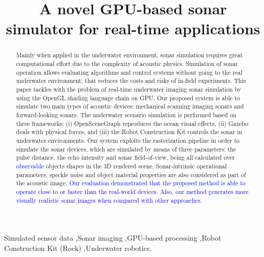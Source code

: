 \documentclass[final,5p,times]{elsarticle}
\begin{document}
\begin{frontmatter}


\title{A novel GPU-based sonar simulator for real-time applications}



\begin{abstract}

Mainly when applied in the underwater environment, sonar simulation requires great computational effort due to the complexity of acoustic physics. Simulation of sonar operation allows evaluating algorithms and control systems without going to the real underwater environment; that reduces the costs and risks of in-field experiments. This paper tackles with the problem of real-time underwater imaging sonar simulation by using the OpenGL shading language chain on GPU. Our proposed system is able to simulate two main types of acoustic devices: mechanical scanning imaging sonars and forward-looking sonars. The underwater scenario simulation is performed based on three frameworks: (i) OpenSceneGraph reproduces the ocean visual effects, (ii) Gazebo deals with physical forces, and (iii) the Robot Construction Kit controls the sonar in underwater environments. Our system exploits the rasterization pipeline in order to simulate the sonar devices, which are simulated by means of three parameters: the pulse distance, the echo intensity and sonar field-of-view, being all calculated over \textcolor{blue}{observable} objects shapes in the 3D rendered scene. Sonar-intrinsic operational parameters, speckle noise and object material properties are also considered as part of the acoustic image. \textcolor{blue}{Our evaluation demonstrated that the proposed method is able to operate close to or faster than the real-world devices. Also, our method generates more visually realistic sonar images when compared with other approaches.}

\end{abstract}

\begin{keyword}
Simulated sensor data
\sep Sonar imaging
\sep GPU-based processing
\sep Robot Construction Kit (Rock)
\sep Underwater robotics.

\end{keyword}

\end{frontmatter}
\end{document}
